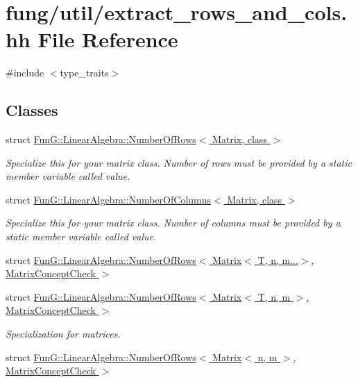 \hypertarget{extract__rows__and__cols_8hh}{\section{fung/util/extract\-\_\-rows\-\_\-and\-\_\-cols.hh \-File \-Reference}
\label{extract__rows__and__cols_8hh}
}
{\ttfamily \#include $<$type\-\_\-traits$>$}\*
\subsection*{\-Classes}
\begin{DoxyCompactItemize}
\item 
struct \hyperlink{structFunG_1_1LinearAlgebra_1_1NumberOfRows}{\-Fun\-G\-::\-Linear\-Algebra\-::\-Number\-Of\-Rows$<$ Matrix, class $>$}
\begin{DoxyCompactList}\small\item\em \-Specialize this for your matrix class. \-Number of rows must be provided by a static member variable called value. \end{DoxyCompactList}\item 
struct \hyperlink{structFunG_1_1LinearAlgebra_1_1NumberOfColumns}{\-Fun\-G\-::\-Linear\-Algebra\-::\-Number\-Of\-Columns$<$ Matrix, class $>$}
\begin{DoxyCompactList}\small\item\em \-Specialize this for your matrix class. \-Number of columns must be provided by a static member variable called value. \end{DoxyCompactList}\item 
struct \hyperlink{structFunG_1_1LinearAlgebra_1_1NumberOfRows_3_01Matrix_3_01T_00_01n_00_01m_8_8_8_4_00_01MatrixConceptCheck_01_4}{\-Fun\-G\-::\-Linear\-Algebra\-::\-Number\-Of\-Rows$<$ Matrix$<$ T, n, m...$>$, Matrix\-Concept\-Check $>$}
\item 
struct \hyperlink{structFunG_1_1LinearAlgebra_1_1NumberOfRows_3_01Matrix_3_01T_00_01n_00_01m_01_4_00_01MatrixConceptCheck_01_4}{\-Fun\-G\-::\-Linear\-Algebra\-::\-Number\-Of\-Rows$<$ Matrix$<$ T, n, m $>$, Matrix\-Concept\-Check $>$}
\begin{DoxyCompactList}\small\item\em \-Specialization for matrices. \end{DoxyCompactList}\item 
struct \hyperlink{structFunG_1_1LinearAlgebra_1_1NumberOfRows_3_01Matrix_3_01n_00_01m_01_4_00_01MatrixConceptCheck_01_4}{\-Fun\-G\-::\-Linear\-Algebra\-::\-Number\-Of\-Rows$<$ Matrix$<$ n, m $>$, Matrix\-Concept\-Check $>$}

\end{DoxyCompactItemize}
